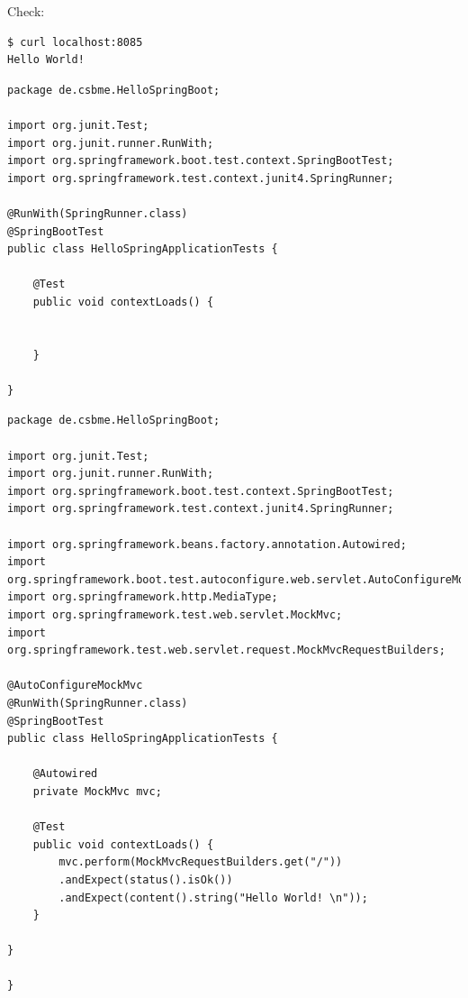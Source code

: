 \documentclass[10pt]{scrartcl}
\begin{document}
Check:
\begin{lstlisting}[language=bash] 
$ curl localhost:8085
Hello World!
\end{lstlisting}

\begin{lstlisting}[style=java] 
package de.csbme.HelloSpringBoot;

import org.junit.Test;
import org.junit.runner.RunWith;
import org.springframework.boot.test.context.SpringBootTest;
import org.springframework.test.context.junit4.SpringRunner;

@RunWith(SpringRunner.class)
@SpringBootTest
public class HelloSpringApplicationTests {
	
	@Test
	public void contextLoads() {
		
		
	}
	
}
\end{lstlisting}


\begin{lstlisting}[style=java] 
package de.csbme.HelloSpringBoot;

import org.junit.Test;
import org.junit.runner.RunWith;
import org.springframework.boot.test.context.SpringBootTest;
import org.springframework.test.context.junit4.SpringRunner;

import org.springframework.beans.factory.annotation.Autowired;
import org.springframework.boot.test.autoconfigure.web.servlet.AutoConfigureMockMvc;
import org.springframework.http.MediaType;
import org.springframework.test.web.servlet.MockMvc;
import org.springframework.test.web.servlet.request.MockMvcRequestBuilders;

@AutoConfigureMockMvc
@RunWith(SpringRunner.class)
@SpringBootTest
public class HelloSpringApplicationTests {
	
	@Autowired
	private MockMvc mvc;
	
	@Test
	public void contextLoads() {
		mvc.perform(MockMvcRequestBuilders.get("/"))
		.andExpect(status().isOk())
		.andExpect(content().string("Hello World! \n"));
	}
	
}

}
\end{lstlisting}
\end{document}
